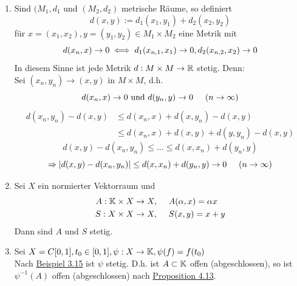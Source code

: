 \begin{beispiel}
	\begin{enumerate}[label=\alph*\upshape)]
		\item Sind $(M_{1}, d_{1}$ und $(M_{2}, d_{2})$ metrische Räume, so definiert
				\[ d(x, y) := d_{1}(x_{1}, y_{1}) + d_{2}(x_{2}, y_{2}) \]
			für $x = (x_{1}, x_{2}), y = (y_{1}, y_{2}) \in M_{1} \times M_{2}$ eine Metrik mit
			\[ d(x_{n}, x) \rightarrow 0 \iff d_{1}(x_{n,1}, x_{1}) \rightarrow 0, d_{2}(x_{n,2}, x_{2}) \rightarrow 0 \]
			In diesem Sinne ist jede Metrik $d: M \times M \rightarrow \mathbb{R}$ stetig. Denn: \\
			Sei $(x_{n}, y_{n}) \rightarrow (x, y)$ in $M \times M$, d.h.
			\[ d(x_{n}, x) \rightarrow 0 \text{ und } d(y_{n}, y) \rightarrow 0 \hspace{0.5cm} (n \rightarrow \infty) \]
			\begin{align*}
				 d(x_{n}, y_{n}) - d(x, y) & \leq d(x_{n}, x) + d(x, y_{n}) - d(x, y) \\
										  & \leq d(x_{n}, x) + d(x, y) + d(y, y_{n}) - d(x, y) 		
			\end{align*}
			\[ d(x, y)- d(x_{n}, y_{n}) \leq \dotsc \leq d(x, x_{n}) + d(y_{n}, y) \]
			\[ \Rightarrow | d(x, y) - d(x_{n}, y_{n}) | \leq d(x, x_{n}) + d(y_{n}, y) \rightarrow 0 \hspace{0.5cm} (n \rightarrow \infty) \]
		\item Sei $X$ ein normierter Vektorraum und
			\begin{align*}
				A: \mathbb{K} \times X \rightarrow X, & \hspace{0.5cm} A( \alpha, x) = \alpha x \\
				S: X \times X \rightarrow X, & \hspace{0.5cm} S(x, y) = x + y
			\end{align*}
			Dann sind $A$ und $S$ stetig.
		\item Sei $X = C[0, 1], t_{0} \in [0, 1], \psi : X \rightarrow \mathbb{K}, \psi(f) = f(t_{0})$ \\
		Nach \hyperref[bsp:1-3.15]{Beispiel 3.15} ist $\psi$ stetig. D.h. ist $A \subset \mathbb{K}$ offen (abgeschlossen), so ist $\psi^{-1}(A)$ offen (abgeschlossen) nach \hyperref[prop:1-4.13]{Proposition 4.13}.
	\end{enumerate}	
\end{beispiel}

\newpage































